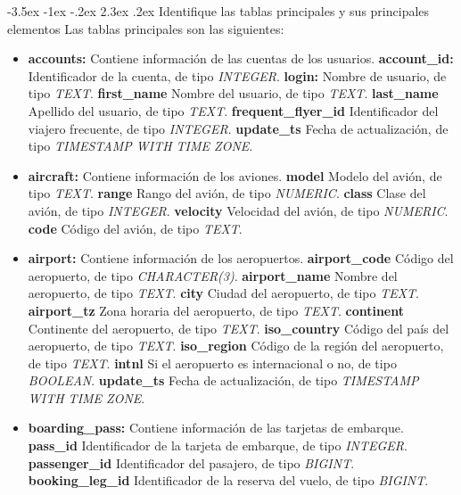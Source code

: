 \documentclass[11pt]{report}
\makeatletter
\renewcommand\chapter{\@startsection{chapter}{0}{\z@}%
    {-3.5ex \@plus -1ex \@minus -.2ex}%
    {2.3ex \@plus.2ex}%
    {\normalfont\Large\bfseries}}
\makeatother
\begin{document}
\chapter{Identifique las tablas principales y sus principales elementos}
Las tablas principales son las siguientes:
\begin{itemize}
  \item \textbf{accounts:} Contiene información de las cuentas de los usuarios.
    \subitem \textbf{account\_id:} Identificador de la cuenta, de tipo \emph{INTEGER}.
    \subitem \textbf{login:} Nombre de usuario, de tipo \emph{TEXT}.
    \subitem \textbf{first\_name} Nombre del usuario, de tipo \emph{TEXT}.
    \subitem \textbf{last\_name} Apellido del usuario, de tipo \emph{TEXT}.
    \subitem \textbf{frequent\_flyer\_id} Identificador del viajero frecuente, de tipo \emph{INTEGER}.
    \subitem \textbf{update\_ts} Fecha de actualización, de tipo \emph{TIMESTAMP WITH TIME ZONE}.
  \item \textbf{aircraft:} Contiene información de los aviones.
    \subitem \textbf{model} Modelo del avión, de tipo \emph{TEXT}.
    \subitem \textbf{range} Rango del avión, de tipo \emph{NUMERIC}.
    \subitem \textbf{class} Clase del avión, de tipo \emph{INTEGER}.
    \subitem \textbf{velocity} Velocidad del avión, de tipo \emph{NUMERIC}.
    \subitem \textbf{code} Código del avión, de tipo \emph{TEXT}.
  \item \textbf{airport:} Contiene información de los aeropuertos.
    \subitem \textbf{airport\_code} Código del aeropuerto, de tipo \emph{CHARACTER(3)}.
    \subitem \textbf{airport\_name} Nombre del aeropuerto, de tipo \emph{TEXT}.
    \subitem \textbf{city} Ciudad del aeropuerto, de tipo \emph{TEXT}.
    \subitem \textbf{airport\_tz} Zona horaria del aeropuerto, de tipo \emph{TEXT}.
    \subitem \textbf{continent} Continente del aeropuerto, de tipo \emph{TEXT}.
    \subitem \textbf{iso\_country} Código del país del aeropuerto, de tipo \emph{TEXT}.
    \subitem \textbf{iso\_region} Código de la región del aeropuerto, de tipo \emph{TEXT}.
    \subitem \textbf{intnl} Si el aeropuerto es internacional o no, de tipo \emph{BOOLEAN}.
    \subitem \textbf{update\_ts} Fecha de actualización, de tipo \emph{TIMESTAMP WITH TIME ZONE}.
  \item \textbf{boarding\_pass:} Contiene información de las tarjetas de embarque.
    \subitem \textbf{pass\_id} Identificador de la tarjeta de embarque, de tipo \emph{INTEGER}.
    \subitem \textbf{passenger\_id} Identificador del pasajero, de tipo \emph{BIGINT}.
    \subitem \textbf{booking\_leg\_id} Identificador de la reserva del vuelo, de tipo \emph{BIGINT}.

\end{itemize}
\end{document}
